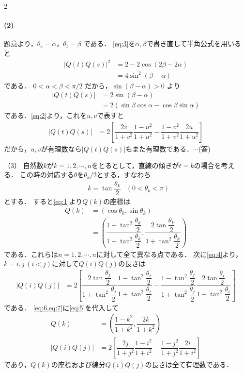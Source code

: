\documentclass[../../main.tex]{subfiles}
\begin{document}
\begin{multicols}{2}
  \paragraph{(2)}
  題意より，$\theta_{s} = \alpha$，$\theta_{t} = \beta$ である．
  \cref{eq:3}を$\alpha,\beta$で書き直して半角公式を用いると
  \begin{align}
    |Q(t)Q(s)|^2
    & = 2 - 2 \cos (2\beta - 2\alpha) \\
    & = 4\sin^2(\beta-\alpha)
  \end{align}
  である．
  $0 < \alpha < \beta < \pi/2$ だから，$\sin(\beta-\alpha)>0$ より
  \begin{align}
    |Q(t)Q(s)|
    & = 2\sin(\beta-\alpha)                          \\
    & = 2(\sin\beta\cos\alpha - \cos\beta\sin\alpha)
  \end{align}
  である．\cref{eq:2}より，これを$u,v$で表すと
  \begin{align}
    |Q(t)Q(s)|
    & = 2\left[\dfrac{2v}{1+v^2}\dfrac{1-u^2}{1+u^2} - \dfrac{1-v^2}{1+v^2}\dfrac{2u}{1+u^2}\right] \label{eq:4}
  \end{align}
  だから，$u,v$が有理数なら$|Q(t)Q(s)|$もまた有理数である．$\cdots$(答)

  （3）
  自然数$k$が$k=1,2,\cdots, n$をとるとして，直線の傾きが$t=k$の場合を考える．
  この時の対応する$\theta$を$\theta_{k}/2$とする，すなわち
  \begin{align}
    & k = \tan \dfrac{\theta_{k}}{2} & \left(0 < \theta_{k} < \pi \right)\label{eq:5}
  \end{align}
  とする．
  すると\cref{eq:1}より$Q(k)$の座標は
  \begin{align}
    Q(k) & = \left(\cos \theta_{k}, \sin\theta_{k}\right)                                                                                                                       \\
    & = \left(\dfrac{1-\tan^2\dfrac{\theta_{k}}{2}}{1+\tan^2\dfrac{\theta_{k}}{2}}, \dfrac{2\tan\dfrac{\theta_{k}}{2}}{1+\tan^2\dfrac{\theta_{k}}{2}}\right) \label{eq:6}
  \end{align}
  である．これらは$n=1,2,\cdots,n$に対して全て異なる点である．
  次に\cref{eq:4}より，$k=i,j\, (i<j)$に対して$Q(i)Q(j)$の長さは
  \begin{align}
    |Q(i)Q(j)|
    & = 2\left[\dfrac{2\tan\dfrac{\theta_{j}}{2}}{1+\tan^2\dfrac{\theta_{j}}{2}}\dfrac{1-\tan^2\dfrac{\theta_{i}}{2}}{1+ \tan^2\dfrac{\theta_{i}}{2}} - \dfrac{1-\tan^2\dfrac{\theta_{j}}{2}}{1+\tan^2\dfrac{\theta_{j}}{2}}\dfrac{2\tan\dfrac{\theta_{i}}{2}}{1+\tan^2\dfrac{\theta_{i}}{2}}\right] \label{eq:7}
  \end{align}
  である．
  \cref{eq:6,eq:7}に\cref{eq:5}を代入して
  \begin{align}
    Q(k) & = \left(\dfrac{1-k^2}{1+k^2}, \dfrac{2k}{1+k^2}\right)                                      \\
    |Q(i)Q(j)|
    & = 2\left[\dfrac{2j}{1+j^2}\dfrac{1-i^2}{1+i^2} - \dfrac{1-j^2}{1+j^2}\dfrac{2i}{1+i^2}\right]
  \end{align}
  であり，$Q(k)$の座標および線分$Q(i)Q(j)$の長さは全て有理数である．


\end{multicols}
\end{document}
